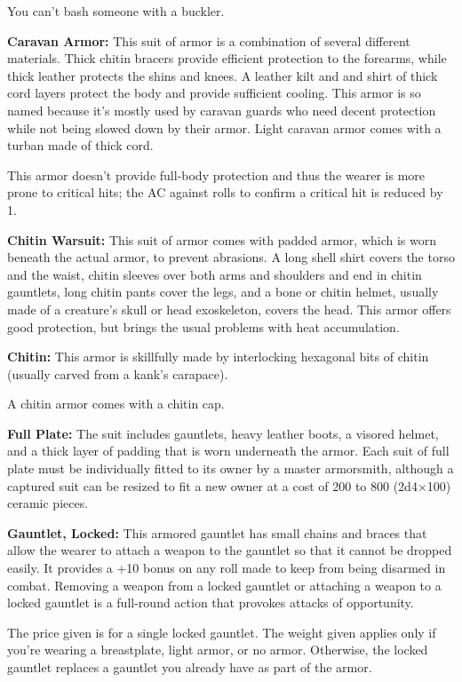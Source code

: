 You can't bash someone with a buckler.

\textbf{Caravan Armor:} This suit of armor is a combination of several different materials. Thick chitin bracers provide efficient protection to the forearms, while thick leather protects the shins and knees. A leather kilt and and shirt of thick cord layers protect the body and provide sufficient cooling. This armor is so named because it's mostly used by caravan guards who need decent protection while not being slowed down by their armor. Light caravan armor comes with a turban made of thick cord.

This armor doesn't provide full-body protection and thus the wearer is more prone to critical hits; the AC against rolls to confirm a critical hit is reduced by 1.

\textbf{Chitin Warsuit:} This suit of armor comes with padded armor, which is worn beneath the actual armor, to prevent abrasions. A long shell shirt covers the torso and the waist, chitin sleeves over both arms and shoulders and end in chitin gauntlets, long chitin pants cover the legs, and a bone or chitin helmet, usually made of a creature's skull or head exoskeleton, covers the head. This armor offers good protection, but brings the usual problems with heat accumulation.

\textbf{Chitin:} This armor is skillfully made by interlocking hexagonal bits of chitin (usually carved from a kank's carapace).

A chitin armor comes with a chitin cap.

\textbf{Full Plate:} The suit includes gauntlets, heavy leather boots, a visored helmet, and a thick layer of padding that is worn underneath the armor. Each suit of full plate must be individually fitted to its owner by a master armorsmith, although a captured suit can be resized to fit a new owner at a cost of 200 to 800 (2d4$\times$100) ceramic pieces.

\textbf{Gauntlet, Locked:} This armored gauntlet has small chains and braces that allow the wearer to attach a weapon to the gauntlet so that it cannot be dropped easily. It provides a +10 bonus on any roll made to keep from being disarmed in combat. Removing a weapon from a locked gauntlet or attaching a weapon to a locked gauntlet is a full-round action that provokes attacks of opportunity.

The price given is for a single locked gauntlet. The weight given applies only if you're wearing a breastplate, light armor, or no armor. Otherwise, the locked gauntlet replaces a gauntlet you already have as part of the armor.

